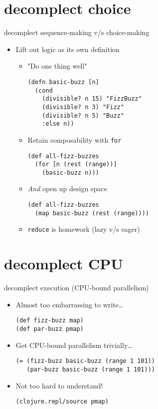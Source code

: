 \documentclass[presentation]{beamer}
\begin{document}
\section{decomplect choice}
\label{sec:orgb43e970}
\begin{frame}[label={sec:orgd9693b6},fragile]{decomplect sequence-making v/s choice-making}
 \begin{itemize}
\item Lift out logic as its own definition
\begin{itemize}
\item "Do one thing well"
\begin{verbatim}
(defn basic-buzz [n]
  (cond
    (divisible? n 15) "FizzBuzz"
    (divisible? n 3) "Fizz"
    (divisible? n 5) "Buzz"
    :else n))
\end{verbatim}
\item Retain composability with \texttt{for}
\begin{verbatim}
(def all-fizz-buzzes
  (for [n (rest (range))]
    (basic-buzz n)))
\end{verbatim}
\item \emph{And} open up design space
\begin{verbatim}
(def all-fizz-buzzes
  (map basic-buzz (rest (range))))
\end{verbatim}
\item \texttt{reduce} is homework (lazy v/s eager)
\end{itemize}
\end{itemize}
\end{frame}
\section{decomplect CPU}
\label{sec:org060b8b9}
\begin{frame}[label={sec:orgef7b39f},fragile]{decomplect execution (CPU-bound parallelism)}
 \begin{itemize}
\item Almost too embarrassing to write\ldots{}
\begin{verbatim}
(def fizz-buzz map)
(def par-buzz pmap)
\end{verbatim}
\item Get CPU-bound parallelism trivially\ldots{}
\begin{verbatim}
(= (fizz-buzz basic-buzz (range 1 101))
   (par-buzz basic-buzz (range 1 101)))
\end{verbatim}
\item Not too hard to understand!
\begin{verbatim}
(clojure.repl/source pmap)
\end{verbatim}
\end{itemize}
\end{frame}
\end{document}
